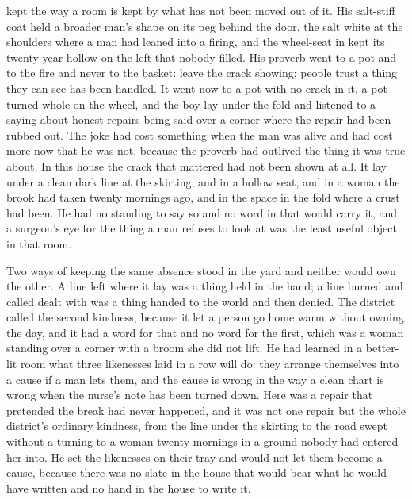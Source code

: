  kept  the way a room is kept by what has not been moved out of it. His salt-stiff coat held a broader man's shape on its peg behind the door, the salt white at the shoulders where a man had leaned into a firing, and the wheel-seat in  kept its twenty-year hollow on the left that nobody filled. His proverb went to a pot and to the fire and never to the basket: leave the crack showing; people trust a thing they can see has been handled. It went now to a pot with no crack in it, a pot turned whole on the wheel, and the boy lay under the fold and listened to a saying about honest repairs being said over a corner where the repair had been rubbed out. The joke had cost something when the man was alive and had cost more now that he was not, because the proverb had outlived the thing it was true about. In this house the crack that mattered had not been shown at all. It lay under a clean dark line at the skirting, and in a hollow seat, and in a woman the brook had taken twenty mornings ago, and in the space in the fold where a crust had been. He had no standing to say so and no word in  that would carry it, and a surgeon's eye for the thing a man refuses to look at was the least useful object in that room.

Two ways of keeping the same absence stood in the yard and neither would own the other. A line left where it lay was a thing held in the hand; a line burned and called dealt with was a thing handed to the world and then denied. The district called the second kindness, because it let a person go home warm without owning the day, and it had a word for that and no word for the first, which was a woman standing over a corner with a broom she did not lift. He had learned in a better-lit room what three likenesses laid in a row will do: they arrange themselves into a cause if a man lets them, and the cause is wrong in the way a clean chart is wrong when the nurse's note has been turned down. Here was a repair that pretended the break had never happened, and it was not one repair but the whole district's ordinary kindness, from the line under the skirting to the road swept without a turning to a woman twenty mornings in a ground nobody had entered her into. He set the likenesses on their tray and would not let them become a cause, because there was no slate in the house that would bear what he would have written and no hand in the house to write it.

